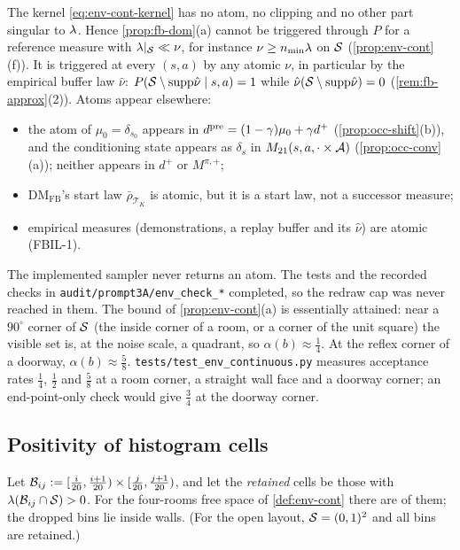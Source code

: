 \begin{remark}\label{rem:env-atoms}
The kernel \eqref{eq:env-cont-kernel} has no atom, no clipping and no other part singular to $\lambda$.
Hence \cref{prop:fb-dom}(a) cannot be triggered through $P$ for a reference measure with $\lambda|_{\mathcal{S}}\ll\nu$, for instance $\nu\ge n_{\min}\lambda$ on $\mathcal{S}$ (\cref{prop:env-cont}(f)).
It is triggered at every $(s,a)$ by any atomic $\nu$, in particular by the empirical buffer law $\hat\nu$: $P(\mathcal{S}\setminus\mathrm{supp}\hat\nu\mid s,a)=1$ while $\hat\nu(\mathcal{S}\setminus\mathrm{supp}\hat\nu)=0$ (\cref{rem:fb-approx}(2)).
Atoms appear elsewhere:
\begin{itemize}[nosep]
\item the atom of $\mu_0=\delta_{s_0}$ appears in $d^{\mathrm{pre}}=(1-\gamma)\mu_0+\gamma d^+$ (\cref{prop:occ-shift}(b)), and the conditioning state appears as $\delta_s$ in $M_{21}(s,a,\cdot\times\mathcal{A})$ (\cref{prop:occ-conv}(a)); neither appears in $d^+$ or $M^{\pi,+}$;
\item DM$_{\mathrm{FB}}$'s start law $\bar\rho_{\mathcal T_K}$ is atomic, but it is a start law, not a successor measure;
\item empirical measures (demonstrations, a replay buffer and its $\hat\nu$) are atomic (FBIL-1).
\end{itemize}
The implemented sampler never returns an atom. The tests and the recorded checks in \texttt{audit/prompt3A/env\_check\_*} completed, so the redraw cap was never reached in them.
The bound of \cref{prop:env-cont}(a) is essentially attained: near a $90^\circ$ corner of $\mathcal{S}$ (the inside corner of a room, or a corner of the unit square) the visible set is, at the noise scale, a quadrant, so $\alpha(b)\approx\frac14$.
At the reflex corner of a doorway, $\alpha(b)\approx\frac58$.
\texttt{tests/test\_env\_continuous.py} measures acceptance rates $\frac14$, $\frac12$ and $\frac58$ at a room corner, a straight wall face and a doorway corner; an end-point-only check would give $\frac34$ at the doorway corner.
\end{remark}

\subsection{Positivity of histogram cells}\label{sec:env-cells}

Let $\mathcal B_{ij}:=[\frac i{20},\frac{i+1}{20})\times[\frac j{20},\frac{j+1}{20})$, and let the \emph{retained} cells be those with $\lambda(\mathcal B_{ij}\cap\mathcal{S})>0$.
For the four-rooms free space of \cref{def:env-cont} there are  of them; the  dropped bins lie inside walls.
(For the open layout, $\mathcal{S}=(0,1)^2$ and all  bins are retained.)

